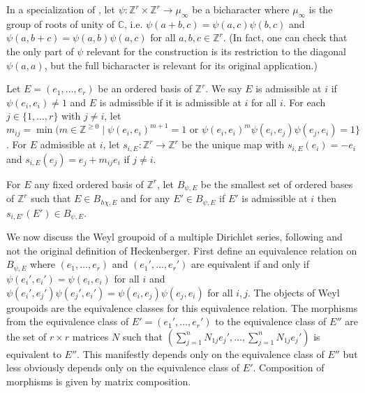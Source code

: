 \documentclass[11pt,letterpaper]{article}
\theoremstyle{definition}
\theoremstyle{remark}
\numberwithin{equation}{section}
\theoremstyle{dotless}
\newcommand{\hchi}{\psi} %
\begin{document}
In a specialization of \cite[\S2]{HeckenbergerRank2}, let $\hchi \colon \mathbb Z^r \times \mathbb Z^r \to \mathbb \mu_\infty$ be a bicharacter where $\mu_{\infty}$ is the group of roots of unity of $\mathbb C$, i.e. $\hchi (a+b,c ) = \hchi(a,c) \hchi (b,c)$ and $\hchi(a, b+c) = \hchi (a,b) \hchi(a,c)$ for all $a,b,c\in \mathbb Z^r$. (In fact, one can check that the only part of $\hchi$ relevant for the construction is its restriction to the diagonal $\hchi(a,a)$, but the full bicharacter is relevant for its original application.)

Let $E= (e_1,\dots, e_r)$ be an ordered basis of $\mathbb Z^r$. We say $E$ is admissible at $i$ if $\hchi(e_i,e_i)\neq 1$ and $E$ is admissible if it is admissible at $i$ for all $i$. For each $j\in \{1,\dots,r\}$ with $j\neq i$, let $m_{ij} = \min ( m \in \mathbb Z^{\geq 0} \mid \hchi(e_i,e_i)^{m+1}=1 \textrm{ or } \hchi(e_i,e_i)^m \hchi(e_i,e_j) \hchi(e_j,e_i) =1\}$. For $E$ admissible at $i$, let $s_{i,E}\colon \mathbb Z^r \to \mathbb Z^r$ be the unique map with $s_{i,E}(e_i) = -e_i$ and $s_{i,E} (e_j)= e_j + m_{ij} e_i$ if $j\neq i$. 

For $E$ any fixed ordered basis of $\mathbb Z^r$, let $B_{\hchi,E}$ be the smallest set of ordered bases of $\mathbb Z^r$ such that $E \in B_{h\chi,E}$ and for any $E'\in B_{\hchi, E}$ if $E'$ is admissible at $i$ then $s_{i,E'}(E')\in B_{\hchi,E}$.

We now discuss the Weyl groupoid of a multiple Dirichlet series, following \cite[p. 262, third paragraph]{HeckenbergerYamabe} and not the original definition of Heckenberger. First define an equivalence relation  on $B_{\hchi,E}$ where $(e_1,\dots,e_r)$ and $(e_1',\dots,e_r')$ are equivalent if and only if $\hchi(e_i',e_i')= \hchi(e_i, e_i)$ for all $i$ and   $\hchi(e_i',e_j')\hchi(e_j',e_i')= \hchi(e_i, e_j)\hchi(e_j, e_i)$ for all $i,j$. The objects of Weyl groupoids are the equivalence classes for this equivalence relation. The morphisms from the equivalence class of $E'= (e_1',\dots, e_r')$ to the equivalence class of $E''$ are the set of $r\times r$ matrices $N$ such that $( \sum_{j=1}^n N_{1j} e_j', \dots, \sum_{j=1}^n N_{1j} e_j')$ is equivalent to $E''$. This manifestly depends only on the equivalence class of $E''$ but less obviously depends only on the equivalence class of $E'$. Composition of morphisms is given by matrix composition. 



\end{document}
